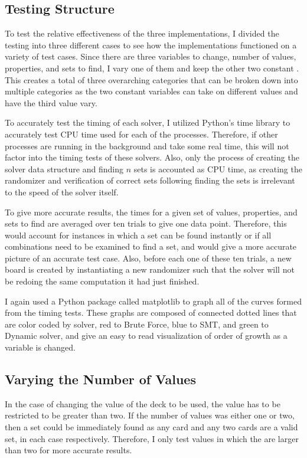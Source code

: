 \documentclass[pageno]{jpaper}
\begin{document}
\subsection{Testing Structure}

To test the relative effectiveness of the three implementations, I divided the testing into three different cases to see how the implementations functioned on a variety of test cases. Since there are three variables to change, number of values, properties, and sets to find, I vary one of them and keep the other two constant . This creates a total of three overarching categories that can be broken down into multiple categories as the two constant variables can take on different values and have the third value vary. 

To accurately test the timing of each solver, I utilized Python's time library to accurately test CPU time used for each of the processes. Therefore, if other processes are running in the background and take some real time, this will not factor into the timing tests of these solvers. Also, only the process of creating the solver data structure and finding $n$ sets is accounted as CPU time, as creating the randomizer and verification of correct sets following finding the sets is irrelevant to the speed of the solver itself. 

To give more accurate results, the times for a given set of values, properties, and sets to find are averaged over ten trials to give one data point. Therefore, this would account for instances in which a set can be found instantly or if all combinations need to be examined to find a set, and would give a more accurate picture of an accurate test case. Also, before each one of these ten trials, a new board is created by instantiating a new randomizer such that the solver will not be redoing the same computation it had just finished. 

I again used a Python package called matplotlib to graph all of the curves formed from the timing tests. These graphs are composed of connected dotted lines that are color coded by solver, red to Brute Force, blue to SMT, and green to Dynamic solver, and give an easy to read visualization of order of growth as a variable is changed. 


\subsection{Varying the Number of Values}

In the case of changing the value of the deck to be used, the value has to be restricted to be greater than two. If the number of values was either one or two, then a set could be immediately found as any card and any two cards are a valid set, in each case respectively. Therefore, I only test values in which the are larger than two for more accurate results. 
\end{document}
